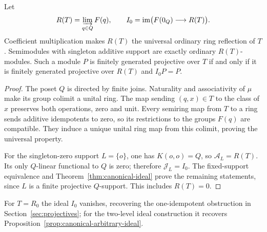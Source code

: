 \begin{corollary}
\label{cor:group-projectives-general}
Let
\[
 R(T)=\varinjlim_{q\in Q}F(q),\qquad
 I_0=\operatorname{im}\bigl(F(0_Q)\longrightarrow R(T)\bigr).
\]
Coefficient multiplication makes $R(T)$ the universal ordinary ring
reflection of $T$. Semimodules with singleton additive support are
exactly ordinary $R(T)$-modules. Such a module $P$ is finitely generated
projective over $T$ if and only if it is finitely generated projective
over $R(T)$ and $I_0P=P$.
\end{corollary}
\begin{proof}
The poset $Q$ is directed by finite joins. Naturality and associativity
of $\mu$ make its group colimit a unital ring. The map sending
$(q,x)\in T$ to the class of $x$ preserves both operations, zero and
unit. Every semiring map from $T$ to a ring sends additive idempotents
to zero, so its restrictions to the groups $F(q)$ are compatible.
They induce a unique unital ring map from this colimit, proving the
universal property.

For the singleton-zero support $L=\{o\}$, one has $K(o,o)=Q$, so
$\mathcal A_L=R(T)$. Its only $Q$-linear functional to $Q$ is zero;
therefore $\mathcal J_L=I_0$. The fixed-support equivalence and
Theorem~\ref{thm:canonical-ideal} prove the remaining statements,
since $L$ is a finite projective $Q$-support. This includes $R(T)=0$.
\end{proof}
For $T=R_0$ the ideal $I_0$ vanishes, recovering
the one-idempotent obstruction in Section~\ref{sec:projectives}; for the two-level ideal
construction it recovers Proposition~\ref{prop:canonical-arbitrary-ideal}.
